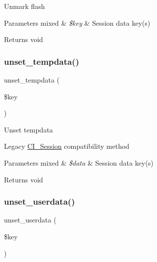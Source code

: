 Unmark flash


\begin{DoxyParams}[1]{Parameters}
mixed & {\em \$key} & Session data key(s) \\
\hline
\end{DoxyParams}
\begin{DoxyReturn}{Returns}
void 
\end{DoxyReturn}
\mbox{\label{class_c_i___session_a79d3115c19f6dfa873ca5f3a7929f24a}} 
\subsubsection{\texorpdfstring{unset\+\_\+tempdata()}{unset\_tempdata()}}
{\footnotesize\ttfamily unset\+\_\+tempdata (\begin{DoxyParamCaption}\item[{}]{\$key }\end{DoxyParamCaption})}

Unset tempdata

Legacy \mbox{\hyperlink{class_c_i___session}{C\+I\+\_\+\+Session}} compatibility method


\begin{DoxyParams}[1]{Parameters}
mixed & {\em \$data} & Session data key(s) \\
\hline
\end{DoxyParams}
\begin{DoxyReturn}{Returns}
void 
\end{DoxyReturn}
\mbox{\label{class_c_i___session_a8d3a4935d2ff2088f11654445d9a0122}} 
\subsubsection{\texorpdfstring{unset\+\_\+userdata()}{unset\_userdata()}}
{\footnotesize\ttfamily unset\+\_\+userdata (\begin{DoxyParamCaption}\item[{}]{\$key }\end{DoxyParamCaption})}

